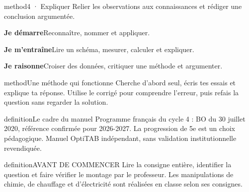 \documentclass[12pt,twoside,openany]{book}
\begin{document}
\begin{pcEncadre}{method}{4 · Expliquer}
Relier les observations aux connaissances et rédiger une conclusion argumentée.\par
\end{pcEncadre}
\noindent{}\quad\textbf{Je démarre}\enspace Reconnaître, nommer et appliquer.\par\vspace{2mm}
\noindent{}\quad\textbf{Je m’entraîne}\enspace Lire un schéma, mesurer, calculer et expliquer.\par\vspace{2mm}
\noindent{}\quad\textbf{Je raisonne}\enspace Croiser des données, critiquer une méthode et argumenter.\par\vspace{2mm}
\label{ressources}
\begin{pcEncadre}{method}{Une méthode qui fonctionne}
Cherche d’abord seul, écris tes essais et explique ta réponse. Utilise le corrigé pour comprendre l’erreur, puis refais la question sans regarder la solution.\par
\end{pcEncadre}
\begin{pcEncadre}{definition}{Le cadre du manuel}
Programme français du cycle 4 : BO du 30 juillet 2020, référence confirmée pour 2026-2027. La progression de 5e est un choix pédagogique. Manuel OptiTAB indépendant, sans validation institutionnelle revendiquée.\par
\end{pcEncadre}
\label{securite}
\begin{pcEncadre}{definition}{AVANT DE COMMENCER}
Lire la consigne entière, identifier la question et faire vérifier le montage par le professeur. Les manipulations de chimie, de chauffage et d’électricité sont réalisées en classe selon ses consignes.\par
\end{pcEncadre}
\end{document}
